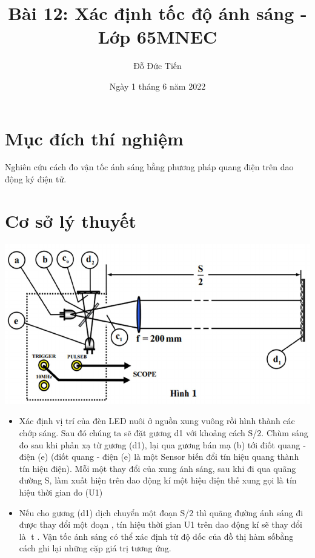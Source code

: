 \documentclass{article}[12pt]
\title{\fontsize{17.5pt}{18.5pt}\selectfont Bài 12: Xác định tốc độ ánh sáng - Lớp 65MNEC}
\author{\fontsize{17.5pt}{18.5pt}\selectfont Đỗ Đức Tiến}
\date{\fontsize{17.5pt}{18.5pt}\selectfont Ngày 1 tháng 6 năm 2022}
\begin{document}
	\maketitle
	\section{\fontsize{17.5pt}{18.5pt}\selectfont Mục đích thí nghiệm}
	 \fontsize{13.5pt}{14.5pt}\selectfont Nghiên cứu cách đo vận tốc ánh sáng bằng phương pháp quang điện trên dao động ký điện tử.
	\section{\fontsize{17.5pt}{18.5pt}\selectfont Cơ sở lý thuyết}
	\includegraphics{download.png}
	\begin{itemize}
		\item Xác định vị trí của đèn LED nuôi ở nguồn xung vuông rồi hình thành các chớp sáng. Sau đó chúng ta sẽ đặt gương d1 với khoảng cách S/2. Chùm sáng đo sau khi phản xạ từ gương (d1), lại qua gương bán mạ (b) tới điốt quang - điện (e) (điốt quang - điện (e) là một Sensor biến đổi tín hiệu quang thành tín hiệu điện). Mỗi một thay đổi của xung ánh sáng, sau khi đi qua quãng đường S, làm xuất hiện trên dao động kí một hiệu điện thế xung gọi là tín hiệu thời gian đo (U1)
		\item Nếu cho gương (d1) dịch chuyển một đoạn S/2 thì quãng đường ánh sáng đi được thay đổi một đoạn \makebox[0.5cm]{\[\Delta S\]} , tín hiệu thời gian U1 trên dao động kí sẽ thay đổi là t . Vận tốc ánh sáng có thể xác định từ độ dốc của đồ thị hàm sốbằng cách ghi lại những cặp giá trị tương ứng.
	\end{itemize}
\end{document}
